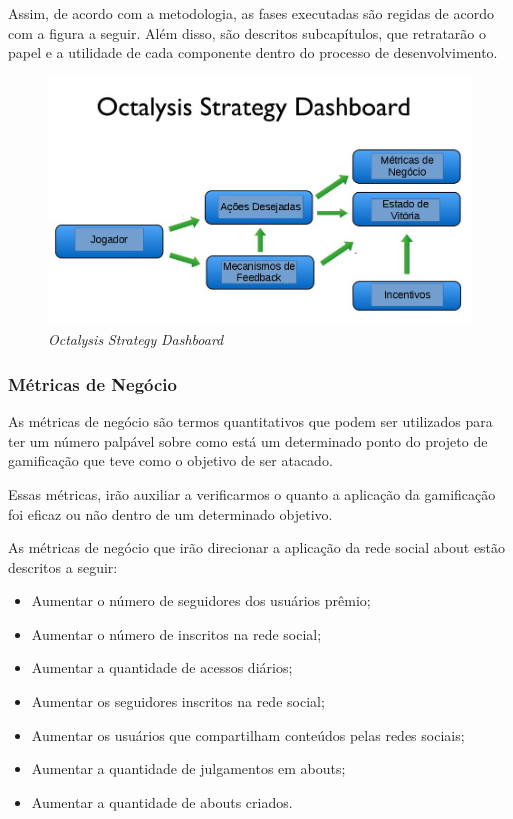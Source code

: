 Assim, de acordo com a metodologia, as fases executadas são regidas de acordo com a
figura a seguir.  Além disso, são descritos subcapítulos, que retratarão o papel e a 
utilidade de cada componente dentro do processo de desenvolvimento.


 \begin{figure}[h]
     \centering

     \includegraphics[width=450px, scale=1]{figuras/dashboard}
     \caption{\textit{Octalysis} \textit{Strategy} \textit{Dashboard}}

     \label{fig:dashboard}
 \end{figure}

\subsubsection{Métricas de Negócio}
\label{sub:business_metrics}
As métricas de negócio são termos quantitativos que podem ser utilizados
para ter um número palpável sobre como está um determinado ponto do projeto de gamificação
que teve como o objetivo de ser atacado.

Essas métricas, irão auxiliar a verificarmos o quanto a aplicação da gamificação foi 
eficaz ou não dentro de um determinado objetivo.

As métricas de negócio que irão direcionar a aplicação da rede social about estão
descritos a seguir:

\begin{itemize}
    \item Aumentar o número de seguidores dos usuários prêmio;
    \item Aumentar o número de inscritos na rede social;
    \item Aumentar a quantidade de acessos diários;
    \item Aumentar os seguidores inscritos na rede social;
    \item Aumentar os usuários que compartilham conteúdos pelas redes sociais;
    \item Aumentar a quantidade de julgamentos em abouts;
    \item Aumentar a quantidade de abouts criados.
\end{itemize}

